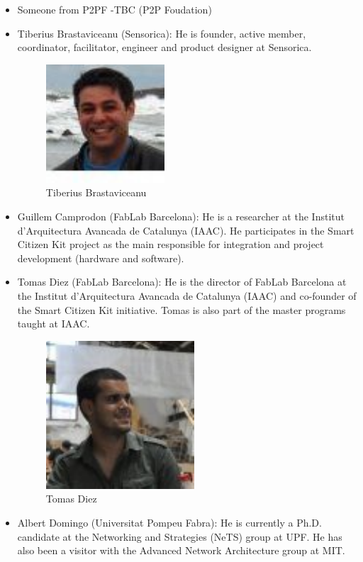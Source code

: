 \documentclass[oneside]{book}   %
\begin{document}
\begin{itemize}
\begin{itemize}
\item Someone from P2PF -TBC (P2P Foudation)
\item Tiberius Brastaviceanu (Sensorica): He is founder, active member, coordinator, facilitator, engineer and product designer at Sensorica.
\begin{figure}
\begin{center}
\includegraphics[width=0.125\linewidth]{Tiberius}
\caption{Tiberius Brastaviceanu}
\end{center}
\end{figure}
\item Guillem Camprodon (FabLab Barcelona): He is a researcher at the Institut d'Arquitectura Avancada de Catalunya (IAAC). He participates in the Smart Citizen Kit project as the main responsible for integration and project development (hardware and software).
\item Tomas Diez (FabLab Barcelona): He is the director of FabLab Barcelona at the Institut d'Arquitectura Avancada de Catalunya (IAAC) and co-founder of the Smart Citizen Kit initiative. Tomas is also part of the master programs taught at IAAC.
\begin{figure}
\begin{center}
\includegraphics[width=0.125\linewidth]{tomas}
\caption{Tomas Diez}
\end{center}
\end{figure}
\item Albert Domingo (Universitat Pompeu Fabra):
He is currently a Ph.D. candidate at the Networking and Strategies (NeTS) group at UPF. He has also been a visitor with the Advanced Network Architecture group at MIT.


\end{itemize}
\end{itemize}
\end{document}
